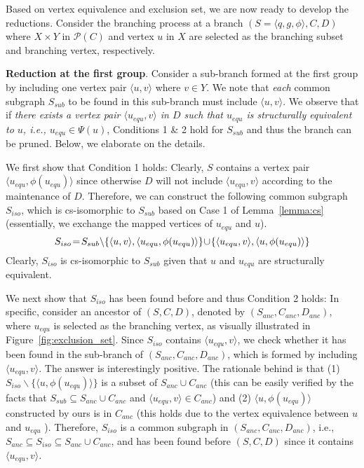 Based on  vertex equivalence and exclusion set, we are now ready to develop the reductions. Consider the branching process at a branch $(S=\langle q,g,\phi\rangle,C,D)$ where $X\times Y$ in $\mathcal{P}(C)$ and vertex $u$ in $X$ are selected as the branching subset and branching vertex, respectively. 

\smallskip
\noindent\textbf{Reduction at the first group}. Consider a sub-branch formed at the first group by including one vertex pair $\langle u,v\rangle$ where $v\in Y$. We note that {\chengC \emph{each}} common subgraph $S_{sub}$ to be found in this sub-branch must include $\langle u,v \rangle$. 
%
We observe that if \emph{there exists a vertex pair $\langle u_{equ},v \rangle$ in $D$ such that $u_{equ}$ is structurally equivalent to $u$, i.e., $u_{equ}\in\Psi(u)$}, Conditions 1 \& 2 hold for $S_{sub}$ and thus the branch can be pruned. Below, we elaborate on the details. 
%

We first show that Condition 1 holds:  Clearly, $S$ contains a vertex pair $\langle u_{equ},\phi(u_{equ}) \rangle$ since otherwise $D$ will not include $\langle u_{equ},v \rangle$ according to the maintenance of $D$.
%
Therefore, we can construct the following common subgraph {\chengC $S_{iso}$, which is} cs-isomorphic to $S_{sub}$ based on Case 1 of Lemma~\ref{lemma:cs} {\chengC (essentially, we exchange the mapped vertices of $u_{equ}$ and $u$)}.
\begin{equation}    
\label{eq:iso1}
S_{iso}\!=\!S_{sub}\backslash\{{ \langle u,v\rangle,\langle u_{equ},\phi(u_{equ})\rangle}\} \!\cup\! \{\langle u_{equ},v\rangle,\langle u,\phi(u_{equ}) \rangle\}
\end{equation}
{\chengC Clearly, $S_{iso}$ is cs-isomorphic to $S_{sub}$ given that $u$ and $u_{equ}$ are structurally equivalent.}

We next show that $S_{iso}$ has been found before and thus Condition 2 holds: In specific, consider an ancestor  of $(S,C,D)$, denoted by $(S_{anc},C_{anc},D_{anc})$, where $u_{equ}$ is selected as the branching vertex, as visually illustrated in Figure~\ref{fig:exclusion_set}. {\chengC Since} $S_{iso}$ contains $\langle u_{equ},v\rangle$, {\chengC we check} whether it has been found in the sub-branch of $(S_{anc},C_{anc},D_{anc})$, which is formed by including $\langle u_{equ},v\rangle$. The answer is interestingly positive. The rationale behind is that (1) $S_{iso}\backslash\{\langle u,\phi(u_{equ})\rangle\}$ is a subset of $S_{anc}\cup C_{anc}$ (this can be easily verified by the facts that $S_{sub} \subseteq S_{anc}\cup C_{anc}$ and $\langle u_{equ},v \rangle\in C_{anc}$) and (2) $\langle u,\phi(u_{equ}) \rangle$ constructed by ours is in $C_{anc}$ (this holds due to the vertex equivalence between $u$ and $u_{equ}$
). Therefore, $S_{iso}$ is a common subgraph in $(S_{anc},C_{anc},D_{anc})$, i.e., $S_{anc}\subseteq S_{iso} \subseteq S_{anc}\cup C_{anc}$, and has been found before $(S,C,D)$ since it contains $\langle u_{equ},v\rangle$. 

